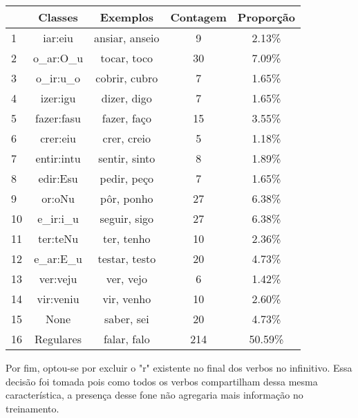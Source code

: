 \begin{table}[H]
\begin{center}
\begin{tabular}{|l|c|c|c|c|}
\toprule
& Classes & Exemplos & Contagem & Proporção\\
\midrule
1 & iar:eiu & ansiar, anseio & 9 & 2.13\%\\
2 & o\_ar:O\_u & tocar, toco & 30 & 7.09\%\\
3 & o\_ir:u\_o & cobrir, cubro & 7 & 1.65\%\\
4 & izer:igu & dizer, digo & 7 & 1.65\%\\
5 & fazer:fasu & fazer, faço & 15 & 3.55\%\\
6 & crer:eiu & crer, creio & 5 & 1.18\%\\
7 & entir:intu & sentir, sinto & 8 & 1.89\% \\
8 & edir:Esu & pedir, peço & 7 & 1.65\%\\
9 & or:oNu & pôr, ponho & 27 & 6.38\%\\
10 & e\_ir:i\_u & seguir, sigo & 27 & 6.38\%\\
11 & ter:teNu & ter, tenho & 10 & 2.36\%\\
12 & e\_ar:E\_u & testar, testo & 20 & 4.73\%\\
13 & ver:veju & ver, vejo & 6 & 1.42\%\\
14 & vir:veniu & vir, venho & 10 & 2.60\%\\
15 & None & saber, sei & 20 & 4.73\%\\
16 & Regulares & falar, falo & 214 & 50.59\%\\
\bottomrule
\end{tabular}
\end{center}
\label{tab:classes}
\end{table}

Por fim, optou-se por excluir o "r" existente no final dos verbos no infinitivo. Essa decisão foi tomada pois como todos os verbos compartilham dessa mesma característica, a presença desse fone não agregaria mais informação no treinamento.